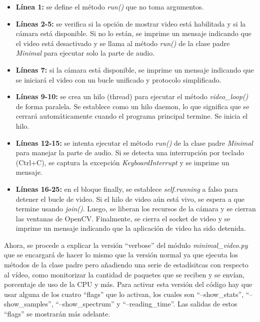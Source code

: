\begin{itemize}
    \item \textbf{Línea 1:} se define el método \textit{run()} que no toma argumentos.
    \item \textbf{Líneas 2-5:} se verifica si la opción de mostrar video está habilitada y si la cámara está disponible. Si no lo están, se imprime un mensaje indicando que el video está desactivado y se llama al método \textit{run()} de la clase padre \textit{Minimal} para ejecutar solo la parte de audio.
    \item \textbf{Líneas 7:} si la cámara está disponible, se imprime un mensaje indicando que se iniciará el video con un bucle unificado y protocolo simplificado.
    \item \textbf{Líneas 9-10:} se crea un hilo (thread) para ejecutar el método \textit{video\_loop()} de forma paralela. Se establece como un hilo daemon, lo que significa que se cerrará automáticamente cuando el programa principal termine. Se inicia el hilo.
    \item \textbf{Líneas 12-15:} se intenta ejecutar el método \textit{run()} de la clase padre \textit{Minimal} para manejar la parte de audio. Si se detecta una interrupción por teclado (Ctrl+C), se captura la excepción \textit{KeyboardInterrupt} y se imprime un mensaje.
    \item \textbf{Líneas 16-25:} en el bloque finally, se establece \textit{self.running} a falso para detener el bucle de video. Si el hilo de video aún está vivo, se espera a que termine usando \textit{join()}. Luego, se liberan los recursos de la cámara y se cierran las ventanas de OpenCV. Finalmente, se cierra el socket de video y se imprime un mensaje indicando que la aplicación de video ha sido detenida.
\end{itemize}

\vspace{\baselineskip}

Ahora, se procede a explicar la versión ``verbose'' del módulo \textit{minimal\_video.py} que se encargará de hacer lo mismo que la versión normal ya que ejecuta los métodos de la clase padre pero añadiendo una serie de estadísitcas con respecto al vídeo, como monitorizar la cantidad de paquetes que se reciben y se envían, porcentaje de uso de la CPU y más. Para activar esta versión del código hay que usar alguna de los cuatro ``flags'' que lo activan, los cuales son ``--show\_stats'', ``--show\_samples'', ``--show\_spectrum'' y ``--reading\_time''. Las salidas de estos ``flags'' se mostrarán más adelante. 
\vspace{\baselineskip}

